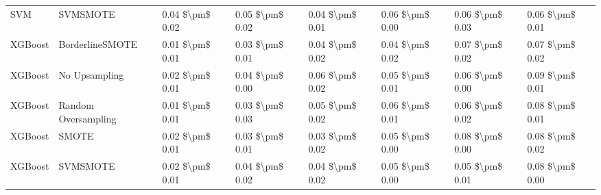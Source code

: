 \begin{tabular}{llllllll}
                            SVM &                      SVMSMOTE & 0.04 \$\textbackslash pm\$ 0.02 &           0.05 \$\textbackslash pm\$ 0.02 &       0.04 \$\textbackslash pm\$ 0.01 &        0.06 \$\textbackslash pm\$ 0.00 &                         0.06 \$\textbackslash pm\$ 0.03 &     0.06 \$\textbackslash pm\$ 0.01 \\
                        XGBoost &               BorderlineSMOTE & 0.01 \$\textbackslash pm\$ 0.01 &           0.03 \$\textbackslash pm\$ 0.01 &       0.04 \$\textbackslash pm\$ 0.02 &        0.04 \$\textbackslash pm\$ 0.02 &                         0.07 \$\textbackslash pm\$ 0.02 &     0.07 \$\textbackslash pm\$ 0.02 \\
                        XGBoost &                 No Upsampling & 0.02 \$\textbackslash pm\$ 0.01 &           0.04 \$\textbackslash pm\$ 0.00 &       0.06 \$\textbackslash pm\$ 0.02 &        0.05 \$\textbackslash pm\$ 0.01 &                         0.06 \$\textbackslash pm\$ 0.00 &     0.09 \$\textbackslash pm\$ 0.01 \\
                        XGBoost &           Random Oversampling & 0.01 \$\textbackslash pm\$ 0.01 &           0.03 \$\textbackslash pm\$ 0.03 &       0.05 \$\textbackslash pm\$ 0.02 &        0.06 \$\textbackslash pm\$ 0.01 &                         0.06 \$\textbackslash pm\$ 0.02 &     0.08 \$\textbackslash pm\$ 0.01 \\
                        XGBoost &                         SMOTE & 0.02 \$\textbackslash pm\$ 0.01 &           0.03 \$\textbackslash pm\$ 0.01 &       0.03 \$\textbackslash pm\$ 0.02 &        0.05 \$\textbackslash pm\$ 0.00 &                         0.08 \$\textbackslash pm\$ 0.00 &     0.08 \$\textbackslash pm\$ 0.02 \\
                        XGBoost &                      SVMSMOTE & 0.02 \$\textbackslash pm\$ 0.01 &           0.04 \$\textbackslash pm\$ 0.02 &       0.04 \$\textbackslash pm\$ 0.02 &        0.05 \$\textbackslash pm\$ 0.00 &                         0.05 \$\textbackslash pm\$ 0.01 &     0.08 \$\textbackslash pm\$ 0.00 \\
\bottomrule
\end{tabular}
